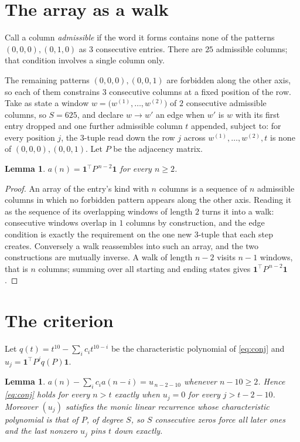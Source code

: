 \documentclass[11pt,a4paper]{article}
\theoremstyle{plain}
\newtheorem{lemma}[theorem]{Lemma}
\theoremstyle{definition}
\begin{document}
\section{The array as a walk}

Call a column \emph{admissible} if the word it forms contains none of the patterns
$(0,0,0), (0,1,0)$ as $3$ consecutive entries. There are $25$ admissible columns; that condition
involves a single column only.

The remaining patterns $(0,0,0), (0,0,1)$ are forbidden along the other axis, so each of them
constrains $3$ consecutive columns at a fixed position of the row. Take as state a
window $w=\bigl(w^{(1)},\dots,w^{(2)}\bigr)$ of $2$ consecutive admissible
columns, so $S=625$, and declare $w\to w'$ an edge when $w'$ is $w$ with its first entry
dropped and one further admissible column $t$ appended, subject to: for every position
$j$, the $3$-tuple read down the row $j$ across $w^{(1)},\dots,w^{(2)},t$
is none of $(0,0,0), (0,0,1)$. Let $P$ be the adjacency matrix.

\begin{lemma}\label{lem:walk}
$a(n)=\mathbf{1}^{\!\top}P^{\,n-2}\mathbf{1}$ for every $n\ge2$.
\end{lemma}

\begin{proof}
An array of the entry's kind with $n$ columns is a sequence of $n$ admissible columns in
which no forbidden pattern appears along the other axis. Reading it as the sequence of its
overlapping windows of length $2$ turns it into a walk: consecutive windows overlap in
$1$ columns by construction, and the edge condition is exactly the requirement on the one
new $3$-tuple that each step creates. Conversely a walk reassembles into such an array,
and the two constructions are mutually inverse. A walk of length $n-2$ visits $n-1$
windows, that is $n$ columns; summing over all starting and ending states gives
$\mathbf{1}^{\!\top}P^{\,n-2}\mathbf{1}$.
\end{proof}

\section{The criterion}

Let $q(t)=t^{10}-\sum_i c_i t^{10-i}$ be the characteristic polynomial of
\eqref{eq:conj} and $u_j=\mathbf{1}^{\!\top}P^{j}q(P)\mathbf{1}$.

\begin{lemma}\label{lem:crit}
$a(n)-\sum_i c_i a(n-i)=u_{\,n-2-10}$ whenever $n-10\ge2$. Hence
\eqref{eq:conj} holds for every $n>t$ exactly when $u_j=0$ for every
$j>t-2-10$. Moreover $(u_j)$ satisfies the monic linear recurrence whose
characteristic polynomial is that of $P$, of degree $S$, so $S$ consecutive zeros force all
later ones and the last nonzero $u_j$ pins $t$ down exactly.
\end{lemma}
\end{document}
